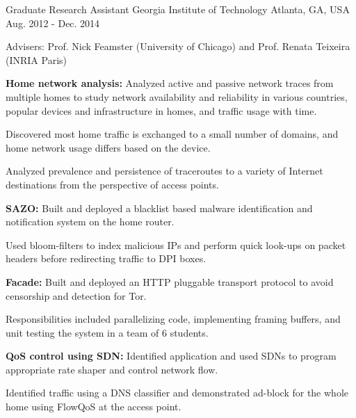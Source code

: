 \begin{cventries}
  \cventry
    {Graduate Research Assistant} %
    {Georgia Institute of Technology} %
    {Atlanta, GA, USA} %
    {Aug. 2012 - Dec. 2014} %
    {
      \begin{cvitems} %
      \item {Advisers: Prof. Nick Feamster (University of Chicago) and Prof. Renata Teixeira (INRIA Paris)}
%      
      \item {\textbf{Home network analysis:} Analyzed active and passive network traces from multiple homes to study network availability and reliability in various countries, popular devices and infrastructure in homes, and traffic usage with time.
      		}
      \item {Discovered most home traffic is exchanged to a small number of domains, and home network usage differs based on the device.}
      \item {Analyzed prevalence and persistence of traceroutes to a variety of Internet destinations from the perspective of access points.}
%     		
      \item {\textbf{SAZO:} Built and deployed a blacklist based malware identification and notification system on the home router.
      		}
      \item {Used bloom-filters to index malicious IPs and perform quick look-ups on packet headers before redirecting traffic to DPI boxes.}
%      
      \item {\textbf{Facade:} Built and deployed an HTTP pluggable transport protocol to avoid censorship and detection for Tor.
      		}
      \item {Responsibilities included parallelizing code, implementing framing buffers, and unit testing the system in a team of 6 students.}
%      
      \item {\textbf{QoS control using SDN:} Identified application and used SDNs to program appropriate rate shaper and control network flow.}
      \item {Identified traffic using a DNS classifier and demonstrated ad-block for the whole home using FlowQoS at the access point.
     		}

\end{cvitems}}
\end{cventries}
